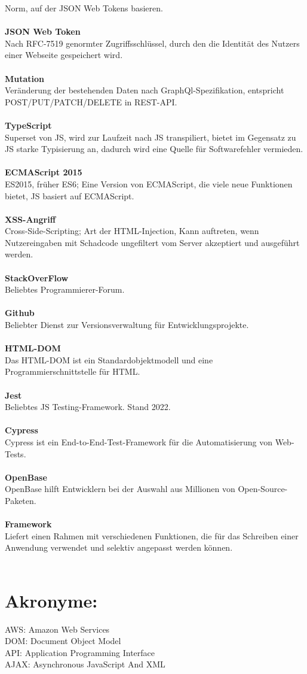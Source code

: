 Norm, auf der JSON Web Tokens basieren.
\\\\
\textbf{JSON Web Token}\\
Nach RFC-7519 genormter Zugriffsschlüssel, durch den die Identität des Nutzers einer Webseite gespeichert wird.
\\\\
\textbf{Mutation}\\
Veränderung der bestehenden Daten nach GraphQl-Spezifikation, entspricht POST/PUT/PATCH/DELETE in REST-API.
\\\\
\textbf{TypeScript}\\
Superset von JS, wird zur Laufzeit nach JS transpiliert, bietet im Gegensatz zu JS starke Typisierung an, dadurch wird eine Quelle für Softwarefehler vermieden.
\\\\
\textbf{ECMAScript 2015}\\
ES2015, früher ES6; Eine Version von ECMAScript, die viele neue Funktionen bietet, JS basiert auf ECMAScript.
\\\\
\textbf{XSS-Angriff}\\
Cross-Side-Scripting; Art der HTML-Injection, Kann auftreten, wenn Nutzereingaben mit Schadcode ungefiltert vom Server akzeptiert und ausgeführt werden.
\\\\
\textbf{StackOverFlow}\\
Beliebtes Programmierer-Forum.
\\\\
\textbf{Github}\\
Beliebter Dienst zur Versionsverwaltung für Entwicklungsprojekte.
\\\\
\textbf{HTML-DOM}\\
Das HTML-DOM ist ein Standardobjektmodell und eine Programmierschnittstelle für HTML.
\\\\
\textbf{Jest}\\
Beliebtes JS Testing-Framework. Stand 2022.
\\\\
\textbf{Cypress}\\
Cypress ist ein End-to-End-Test-Framework für die Automatisierung von Web-Tests.
\\\\
\textbf{OpenBase}\\
OpenBase hilft Entwicklern bei der Auswahl aus Millionen von Open-Source-Paketen.
\\\\
\textbf{Framework}\\
Liefert einen Rahmen mit verschiedenen Funktionen, die für das Schreiben einer Anwendung verwendet und selektiv angepasst werden können.
\\\\

\section*{Akronyme:}
{AWS}: {Amazon Web Services}\\
{DOM}: {Document Object Model}\\
{API}: {Application Programming Interface}\\
{AJAX}: {Asynchronous JavaScript And XML}\\